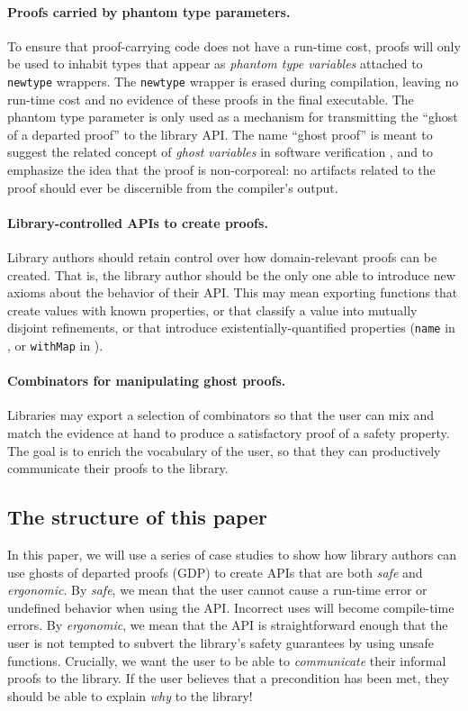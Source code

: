 \documentclass[format=sigplan, review=false, screen=true]{acmart}
\begin{document}
\paragraph{Proofs carried by phantom type parameters.}
  To ensure that proof-carrying code does not have a run-time cost, proofs will only
  be used to inhabit types that appear as \emph{phantom type variables} attached to
  \texttt{newtype} wrappers.
  The \texttt{newtype} wrapper is erased during compilation, leaving no run-time cost and
  no evidence of these proofs in the final executable.
  The phantom type parameter is only used as a mechanism for transmitting the
  ``ghost of a departed proof'' to the library API.
  The name ``ghost proof'' is meant to suggest the related concept of \emph{ghost variables} in software
  verification \cite{leavens1999jml}, and to emphasize the idea that the proof is non-corporeal: no
  artifacts related to the proof should ever be discernible from the compiler's output.
\paragraph{Library-controlled APIs to create proofs.}
  Library authors should retain control over how domain-relevant proofs can be created.
  That is, the library author should be the only one able to introduce new axioms about
  the behavior of their API.
  This may mean exporting functions that create values with known properties, or that
  classify a value into mutually disjoint refinements,
or that introduce existentially-quantified properties (\texttt{name} in , or \texttt{withMap}
in ).
\paragraph{Combinators for manipulating ghost proofs.}
  Libraries may export a selection of combinators so that the user can
  mix and match the evidence at hand to produce a satisfactory proof of a
  safety property. The goal is to enrich the vocabulary of the user, so
  that they can productively communicate their proofs to the library.


\subsection{The structure of this paper}
In this paper, we will use a series of case studies to show how library authors can use
ghosts of departed proofs (GDP) to create
APIs that are both \emph{safe} and \emph{ergonomic}. By \emph{safe}, we mean that the
user cannot cause a run-time error or undefined behavior when using the API. Incorrect uses
will become compile-time errors. By \emph{ergonomic}, we mean that the API is straightforward
enough that the user is not tempted to subvert the library's safety guarantees by using
unsafe functions. Crucially, we want the user to be able to \emph{communicate} their
informal proofs to the library. If the user believes that a precondition has been met,
they should be able to explain \emph{why} to the library!
\end{document}
